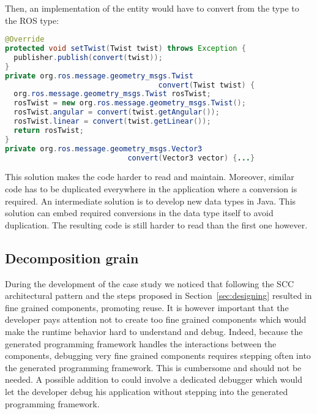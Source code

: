 Then, an implementation of the  entity would have to convert
from the \diaspec{}  type to the ROS  type:

\begin{lstlisting}[language=java, numbers=none]
@Override
protected void setTwist(Twist twist) throws Exception {
  publisher.publish(convert(twist));
}
private org.ros.message.geometry_msgs.Twist
                                   convert(Twist twist) {
  org.ros.message.geometry_msgs.Twist rosTwist;
  rosTwist = new org.ros.message.geometry_msgs.Twist();
  rosTwist.angular = convert(twist.getAngular());
  rosTwist.linear = convert(twist.getLinear());
  return rosTwist;
}
private org.ros.message.geometry_msgs.Vector3
                            convert(Vector3 vector) {...}
\end{lstlisting}

This solution makes the code harder to read and maintain. Moreover,
similar code has to be duplicated everywhere in the application where
a conversion is required. An intermediate solution is to develop new
data types in Java. This solution can embed required conversions in
the data type itself to avoid duplication. The resulting code is still
harder to read than the first one however.

\subsection{Decomposition grain}

During the development of the case study we noticed that following the
SCC architectural pattern and the steps proposed in
Section~\ref{sec:designing} resulted in fine grained components,
promoting reuse. It is however important that the developer pays
attention not to create too fine grained components which would make
the runtime behavior hard to understand and debug. Indeed, because the
generated programming framework handles the interactions between the
components, debugging very fine grained components requires stepping
often into the generated programming framework. This is cumbersome and
should not be needed. A possible addition to \diaspec{} could involve
a dedicated debugger which would let the developer debug his
application without stepping into the generated programming framework.

